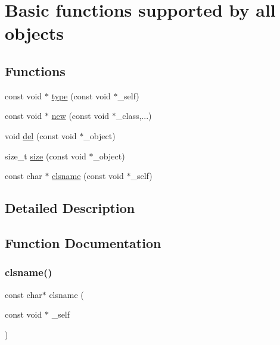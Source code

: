\hypertarget{group__basic}{}\section{Basic functions supported by all objects}
\label{group__basic}
\subsection*{Functions}
\begin{DoxyCompactItemize}
\item 
const void $\ast$ \mbox{\hyperlink{group__basic_ga504cef7fd39aff50e8e27f4f74568753}{type}} (const void $\ast$\+\_\+self)
\item 
const void $\ast$ \mbox{\hyperlink{group__basic_gaa356efc2c9e72711bf56b41a4f7b125f}{new}} (const void $\ast$\+\_\+class,...)
\item 
void \mbox{\hyperlink{group__basic_gae293fe2fbbf9f2e8a87c1141e7412814}{del}} (const void $\ast$\+\_\+object)
\item 
size\+\_\+t \mbox{\hyperlink{group__basic_gafac8564ed88a6f8585f043fc6b2fa7e1}{size}} (const void $\ast$\+\_\+object)
\item 
const char $\ast$ \mbox{\hyperlink{group__basic_gadcc35aece3f8a4c822a9bf2a591f087b}{clsname}} (const void $\ast$\+\_\+self)
\end{DoxyCompactItemize}


\subsection{Detailed Description}


\subsection{Function Documentation}
\mbox{\label{group__basic_gadcc35aece3f8a4c822a9bf2a591f087b}} 
\subsubsection{\texorpdfstring{clsname()}{clsname()}}
{\footnotesize\ttfamily const char$\ast$ clsname (\begin{DoxyParamCaption}\item[{const void $\ast$}]{\+\_\+self }\end{DoxyParamCaption})}



